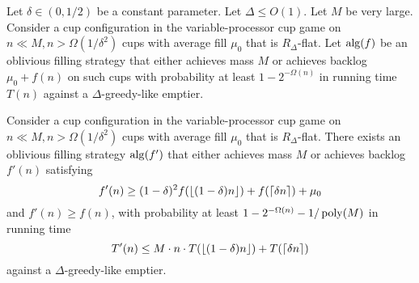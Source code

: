 \begin{lemma}
  \label{lem:obliviousAmplification} 
  Let $\delta \in (0, 1/2)$ be a constant parameter. Let $\Delta
  \le O(1)$. Let $M$ be very large. Consider a cup configuration
  in the variable-processor cup game on $n\ll M, n >
  \Omega(1/\delta^2)$ cups with average fill $\mu_0$ that is
  $R_\Delta$-flat. Let $\operatorname{\text{\textup{alg}}}(f)$ be an oblivious filling strategy
  that either achieves mass $M$ or achieves backlog $\mu_0 +
  f(n)$ on such cups with probability at least $1-2^{-\Omega(n)}$
  in running time $T(n)$ against a $\Delta$-greedy-like emptier.

  Consider a cup configuration in the variable-processor cup game
  on $n\ll M, n > \Omega(1/\delta^2)$ cups with average fill
  $\mu_0$ that is $R_\Delta$-flat. There exists an oblivious
  filling strategy $\operatorname{\text{\textup{alg}}}(f')$ that either achieves mass $M$ or
  achieves backlog $f'(n)$ satisfying $$f'(n) \ge (1-\delta)^2
  f(\left\lfloor (1-\delta)n \right\rfloor) + f(\left\lceil \delta n \right\rceil) + \mu_0$$ and
  $f'(n) \ge f(n)$, with probability at least
  $1-2^{-\Omega(n)}-1/\operatorname{\text{poly}}(M)$ in running time $$T'(n) \le
  M\cdot n\cdot T(\left\lfloor (1-\delta)n \right\rfloor) + T(\left\lceil \delta n \right\rceil)$$
  against a $\Delta$-greedy-like emptier.
\end{lemma}

